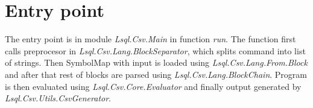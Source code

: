 \section{Entry point}
The entry point is in module \textit{Lsql.Csv.Main} in function \textit{run}. 
The function first calls preprocesor in \textit{Lsql.Csv.Lang.BlockSeparator}, which splits command into list of strings. Then SymbolMap with input is loaded using \textit{Lsql.Csv.Lang.From.Block} and after that
rest of blocks are parsed using \textit{Lsql.Csv.Lang.BlockChain}. Program is then evaluated using
\textit{Lsql.Csv.Core.Evaluator} and finally output generated by \textit{Lsql.Csv.Utils.CsvGenerator}.



